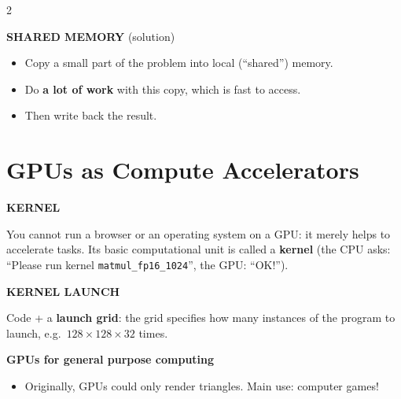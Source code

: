\documentclass[a4paper,9pt]{extarticle}
\begin{document}
\begin{multicols}{2}
\begin{warning}
\end{warning}


\begin{definition}

\textbf{SHARED MEMORY} (solution)

\begin{itemize}

\item Copy a small part of the problem into local (``shared'') memory.

\item Do \textbf{a lot of work} with this copy, which is fast to access.

\item Then write back the result.

\end{itemize}

\end{definition}



\section{GPUs as Compute Accelerators}


\begin{definition}

\textbf{KERNEL}

You cannot run a browser or an operating system on a GPU: it merely helps to accelerate tasks.
Its basic computational unit is called a \textbf{kernel} (the CPU asks: ``Please run kernel
\texttt{matmul\_fp16\_1024}'', the GPU: ``OK!'').

\end{definition}


\begin{definition}

\textbf{KERNEL LAUNCH}

Code + a \textbf{launch grid}: the grid specifies how many instances of the program to launch,
e.g.\ $128 \times 128 \times 32$ times.

\end{definition}


\begin{example}

\textbf{GPUs for general purpose computing}

\begin{itemize}

\item Originally, GPUs could only render triangles. Main use: computer games!


\end{itemize}
\end{example}
\end{multicols}
\end{document}

